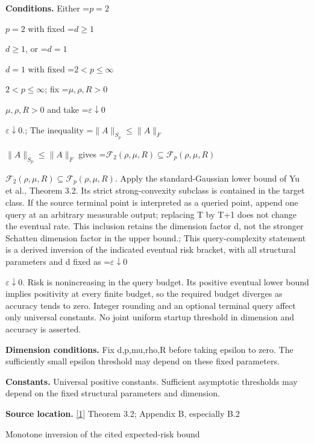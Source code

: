 \documentclass[10pt,a4paper]{article}
\newcommand{\AtlasMath}[1]{\par\begingroup\centering\setbox0=\hbox{$\displaystyle #1$}\ifdim\wd0>1.4\linewidth\typeout{ATLAS WIDE FORMULA: \the\wd0}\fi\ifdim\wd0>\linewidth\resizebox{\linewidth}{!}{\box0}\else\box0\fi\par\endgroup}
\newcommand{\AtlasInlineMath}[1]{\begingroup\setbox0=\hbox{$#1$}\ifdim\wd0>.4\linewidth\endgroup\AtlasMath{#1}\else\endgroup$#1$\fi}
\begin{document}
\textbf{Conditions.} Either \AtlasInlineMath{p=2} with fixed \AtlasInlineMath{d\ge1}, or \AtlasInlineMath{d=1} with fixed \AtlasInlineMath{2<p\le\infty}; fix \AtlasInlineMath{\mu,\rho,R>0} and take \AtlasInlineMath{\varepsilon\downarrow0}.; The inequality \AtlasInlineMath{\|A\|_{S_p}\le\|A\|_F} gives \AtlasInlineMath{\mathcal F_2(\rho,\mu,R)\subseteq\mathcal F_p(\rho,\mu,R)}. Apply the standard-Gaussian lower bound of Yu et al., Theorem 3.2. Its strict strong-convexity subclass is contained in the target class. If the source terminal point is interpreted as a queried point, append one query at an arbitrary measurable output; replacing T by T+1 does not change the eventual rate. This inclusion retains the dimension factor d, not the stronger Schatten dimension factor in the upper bound.; This query-complexity statement is a derived inversion of the indicated eventual risk bracket, with all structural parameters and d fixed as \AtlasInlineMath{\varepsilon\downarrow0}. Risk is nonincreasing in the query budget. Its positive eventual lower bound implies positivity at every finite budget, so the required budget diverges as accuracy tends to zero. Integer rounding and an optional terminal query affect only universal constants. No joint uniform startup threshold in dimension and accuracy is asserted.



\textbf{Dimension conditions.} Fix d,p,mu,rho,R before taking epsilon to zero. The sufficiently small epsilon threshold may depend on these fixed parameters.



\textbf{Constants.} Universal positive constants. Sufficient asymptotic thresholds may depend on the fixed structural parameters and dimension.



\textbf{Source location.} \href{https://papers.nips.cc/paper_files/paper/2024/file/b444ad72520a5f5c467343be88e352ed-Paper-Conference.pdf}{[1]} Theorem 3.2; Appendix B, especially B.2



Monotone inversion of the cited expected-risk bound
\end{document}
